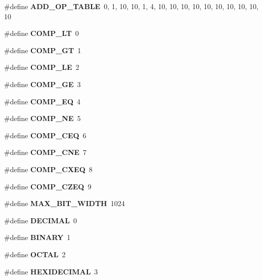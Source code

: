 \begin{CompactItemize}
\item 
\#define {\bf ADD\_\-OP\_\-TABLE}\ 0,  1,  10, 10, 1,  4,  10, 10, 10, 10, 10, 10, 10, 10, 10, 10
\item 
\#define {\bf COMP\_\-LT}\ 0
\item 
\#define {\bf COMP\_\-GT}\ 1
\item 
\#define {\bf COMP\_\-LE}\ 2
\item 
\#define {\bf COMP\_\-GE}\ 3
\item 
\#define {\bf COMP\_\-EQ}\ 4
\item 
\#define {\bf COMP\_\-NE}\ 5
\item 
\#define {\bf COMP\_\-CEQ}\ 6
\item 
\#define {\bf COMP\_\-CNE}\ 7
\item 
\#define {\bf COMP\_\-CXEQ}\ 8
\item 
\#define {\bf COMP\_\-CZEQ}\ 9
\item 
\#define {\bf MAX\_\-BIT\_\-WIDTH}\ 1024
\item 
\#define {\bf DECIMAL}\ 0
\item 
\#define {\bf BINARY}\ 1
\item 
\#define {\bf OCTAL}\ 2
\item 
\#define {\bf HEXIDECIMAL}\ 3
\end{CompactItemize}
